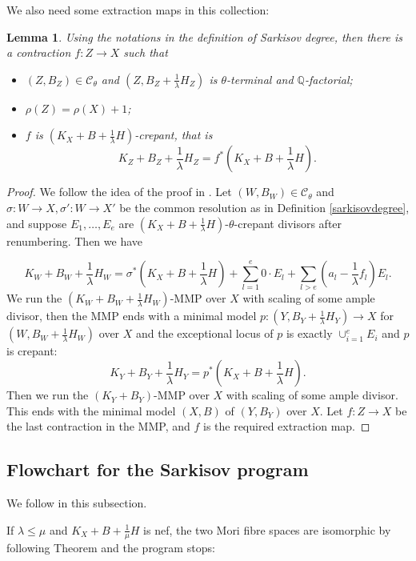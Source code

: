 \documentclass[11pt]{amsart}
\newtheorem{lem}[defn]{Lemma}
\begin{document}
We also need some  extraction maps in this collection:
\begin{lem}\label{thetaextraction}
Using the notations in the definition of Sarkisov degree, then there is a contraction  $f:Z\to X$ such that 
\begin{itemize}
  \item $(Z,B_{Z})\in \mathcal{C}_{\theta}$ and $(Z,B_{Z}+\frac{1}{\lambda}H_{Z})$ is $\theta$-terminal and $\mathbb{Q}$-factorial;
    \item  $\rho(Z)=\rho(X)+1$;
    \item $f$ is $(K_{X}+B+\frac{1}{\lambda}H)$-crepant, that is 
      \[
        K_{Z}+B_{Z}+\frac{1}{\lambda}H_{Z}=f^*(K_{X}+B+\frac{1}{\lambda}H)
      .\] 
\end{itemize}
\end{lem}
\begin{proof}
  We follow the idea of the proof in \cite[Proposition 1.6]{brunoLogSarkisovProgram1995}.  Let $(W,B_{W})\in \mathcal{C}_{\theta}$ and $\sigma:W\to X,\sigma':W \to X'$ be the common resolution as in Definition \ref{sarkisovdegree}, and suppose  $E_{1},\ldots ,E_{e}$ are   $(K_{X}+B+\frac{1}{\lambda}H)$-$\theta$-crepant divisors after renumbering. Then we have

\[ K_W+B_W+\frac{1}{\lambda} H_W=\sigma^*(K_X+B+\frac{1}{\lambda} H)+\sum_{l=1}^{e} 0\cdot E_{l}+\sum_{l>e}(a_l-\frac{1}{\lambda} f_l)E_l .\]
We run the $(K_{W}+B_{W}+\frac{1}{\lambda}H_{W})$-MMP over $X$ with scaling of some ample divisor, then the MMP ends with a minimal model $p:(Y,B_{Y}+\frac{1}{\lambda}H_{Y})\to X$  for $(W,B_{W}+\frac{1}{\lambda}H_{W})$ over $X$ and the exceptional locus of $p$ is exactly $\cup_{i=1}^{e}E_{i}$ and $p$ is crepant: 
\[
 K_{Y}+B_{Y}+\frac{1}{\lambda}H_{Y}=p^*(K_{X}+B+\frac{1}{\lambda}H) 
.\]
Then we run the $(K_{Y}+B_{Y})$-MMP over $X$ with scaling of some ample divisor. This ends with the minimal model  $(X,B)$ of $(Y,B_{Y})$ over $X$. Let $f:Z\to X$ be the last  contraction in the MMP, and $f$ is the required extraction map.
\end{proof}
\subsection{Flowchart for the Sarkisov program}
We follow \cite[\S1]{brunoLogSarkisovProgram1995} in this subsection.

If $ \lambda\leqslant\mu $ and $ K_X+B+\frac{1}{\mu}H $ is nef, the two Mori fibre spaces are isomorphic by following Theorem and the program stops:
\end{document}
